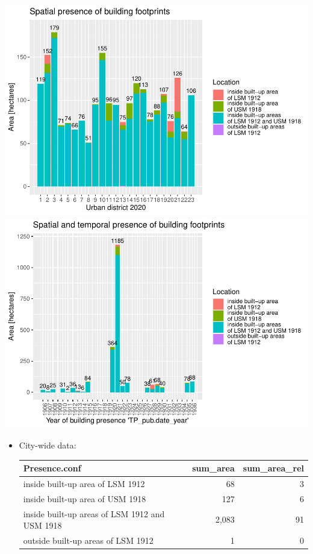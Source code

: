 \documentclass[
]{article}
\providecommand{\tightlist}{%
  \setlength{\itemsep}{0pt}\setlength{\parskip}{0pt}}
\begin{document}
\includegraphics{Usage_code_files/figure-latex/unnamed-chunk-13-1.pdf}
\includegraphics{Usage_code_files/figure-latex/unnamed-chunk-13-2.pdf}

\begin{itemize}
\tightlist
\item
  City-wide data:

  \begin{tabular}[t]{l|r|r}
  \hline
  Presence.conf & sum\_area & sum\_area\_rel\\
  \hline
  inside built-up area
  of LSM 1912 & 68 & 3\\
  \hline
  inside built-up area
  of USM 1918 & 127 & 6\\
  \hline
  inside built-up areas
  of LSM 1912 and USM 1918 & 2,083 & 91\\
  \hline
  outside built-up areas
  of LSM 1912 & 1 & 0\\
  \hline
  \end{tabular}
\end{itemize}
\end{document}

